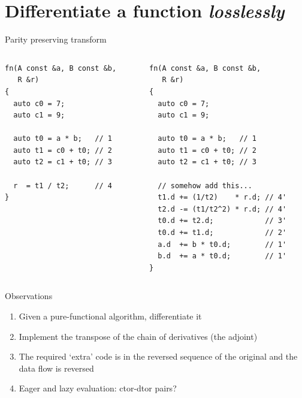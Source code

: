 \documentclass[xcolor=dvipsnames]{beamer}
\begin{document}
\section{Differentiate a function \protect\textit{losslessly}}

\begin{frame}[fragile]{Parity preserving transform}
  \begin{columns}[T] %
    \begin{column}{0.44\textwidth}
      {\color{gray}{write something like this \dots}}
      \begin{lstlisting}
fn(A const &a, B const &b,
   R &r)
{
  auto c0 = 7;
  auto c1 = 9;

  auto t0 = a * b;   // 1
  auto t1 = c0 + t0; // 2
  auto t2 = c1 + t0; // 3

  r  = t1 / t2;      // 4
}
  \end{lstlisting}
    \end{column}%
    \hfill%
    \begin{column}{0.56\textwidth}
      {\color{gray}{to implement something like this}}
        \begin{lstlisting}
fn(A const &a, B const &b,
   R &r)
{
  auto c0 = 7;
  auto c1 = 9;

  auto t0 = a * b;   // 1
  auto t1 = c0 + t0; // 2
  auto t2 = c1 + t0; // 3

  // somehow add this...
  t1.d += (1/t2)    * r.d; // 4'
  t2.d -= (t1/t2^2) * r.d; // 4'
  t0.d += t2.d;            // 3'
  t0.d += t1.d;            // 2'
  a.d  += b * t0.d;        // 1'
  b.d  += a * t0.d;        // 1'
}
  \end{lstlisting}
    \end{column}%
  \end{columns}
\end{frame}


\begin{frame}[fragile]{Observations}
  \begin{enumerate}
  \item Given a pure-functional algorithm, differentiate it \vspace{5mm}
  \item Implement the transpose of the chain of derivatives (the adjoint) \vspace{5mm}
  \item The required `extra' code is in the reversed sequence of the original and the data flow is reversed \vspace{5mm}
  \item Eager and lazy evaluation: ctor-dtor pairs? \vspace{5mm}
  \end{enumerate}
\end{frame}
\end{document}
